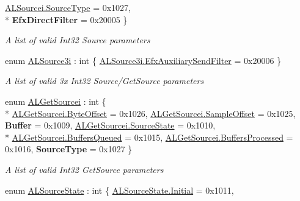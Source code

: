 \begin{DoxyCompactItemize}
\hyperlink{namespace_open_t_k_1_1_audio_1_1_open_a_l_a364b4250b263feec3ed248be5b6a3117a846ec4a166054f871d360005066a2201}{A\-L\-Sourcei.\-Source\-Type} = 0x1027, 
\\*
{\bfseries Efx\-Direct\-Filter} = 0x20005
 \}
\begin{DoxyCompactList}\small\item\em A list of valid Int32 Source parameters\end{DoxyCompactList}\item 
enum \hyperlink{namespace_open_t_k_1_1_audio_1_1_open_a_l_a5038b3efb0e0b18183b96cc12b925987}{A\-L\-Source3i} \-: int \{ \hyperlink{namespace_open_t_k_1_1_audio_1_1_open_a_l_a5038b3efb0e0b18183b96cc12b925987a68ed9e08d43ded7b802e062997389b2b}{A\-L\-Source3i.\-Efx\-Auxiliary\-Send\-Filter} = 0x20006
 \}
\begin{DoxyCompactList}\small\item\em A list of valid 3x Int32 Source/\-Get\-Source parameters\end{DoxyCompactList}\item 
enum \hyperlink{namespace_open_t_k_1_1_audio_1_1_open_a_l_af53d9846ac8c67c349af460bade8edbc}{A\-L\-Get\-Sourcei} \-: int \{ \\*
\hyperlink{namespace_open_t_k_1_1_audio_1_1_open_a_l_af53d9846ac8c67c349af460bade8edbca511cf6f133343126fd2e4d66ceb11697}{A\-L\-Get\-Sourcei.\-Byte\-Offset} = 0x1026, 
\hyperlink{namespace_open_t_k_1_1_audio_1_1_open_a_l_af53d9846ac8c67c349af460bade8edbcaf77505cd3681a499d34acfed3a6e049e}{A\-L\-Get\-Sourcei.\-Sample\-Offset} = 0x1025, 
{\bfseries Buffer} = 0x1009, 
\hyperlink{namespace_open_t_k_1_1_audio_1_1_open_a_l_af53d9846ac8c67c349af460bade8edbca5b59196cafd989487d57df34474121cc}{A\-L\-Get\-Sourcei.\-Source\-State} = 0x1010, 
\\*
\hyperlink{namespace_open_t_k_1_1_audio_1_1_open_a_l_af53d9846ac8c67c349af460bade8edbca60b1be0b1693139949385cfe72581111}{A\-L\-Get\-Sourcei.\-Buffers\-Queued} = 0x1015, 
\hyperlink{namespace_open_t_k_1_1_audio_1_1_open_a_l_af53d9846ac8c67c349af460bade8edbcacb1ae2d18d0e4ebba248a761a1740a0e}{A\-L\-Get\-Sourcei.\-Buffers\-Processed} = 0x1016, 
{\bfseries Source\-Type} = 0x1027
 \}
\begin{DoxyCompactList}\small\item\em A list of valid Int32 Get\-Source parameters\end{DoxyCompactList}\item 
enum \hyperlink{namespace_open_t_k_1_1_audio_1_1_open_a_l_a5b2a6fe6458bb334071d8246600865cc}{A\-L\-Source\-State} \-: int \{ \hyperlink{namespace_open_t_k_1_1_audio_1_1_open_a_l_a5b2a6fe6458bb334071d8246600865cca4f2a91e15af2631ff9424564b8a45fb2}{A\-L\-Source\-State.\-Initial} = 0x1011, 

\end{DoxyCompactItemize}
